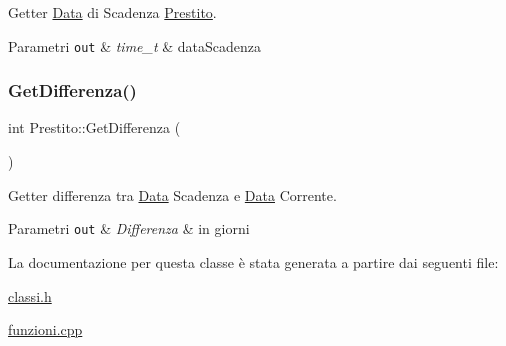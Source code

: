 Getter \mbox{\hyperlink{class_data}{Data}} di Scadenza \mbox{\hyperlink{class_prestito}{Prestito}}. 


\begin{DoxyParams}[1]{Parametri}
\mbox{\tt out}  & {\em time\+\_\+t} & data\+Scadenza \\
\hline
\end{DoxyParams}
\mbox{\label{class_prestito_a556664904743c53cc6504a913b0c7394}} 
\subsubsection{\texorpdfstring{Get\+Differenza()}{GetDifferenza()}}
{\footnotesize\ttfamily int Prestito\+::\+Get\+Differenza (\begin{DoxyParamCaption}{ }\end{DoxyParamCaption})}



Getter differenza tra \mbox{\hyperlink{class_data}{Data}} Scadenza e \mbox{\hyperlink{class_data}{Data}} Corrente. 


\begin{DoxyParams}[1]{Parametri}
\mbox{\tt out}  & {\em Differenza} & in giorni \\
\hline
\end{DoxyParams}


La documentazione per questa classe è stata generata a partire dai seguenti file\+:\begin{DoxyCompactItemize}
\item 
\mbox{\hyperlink{classi_8h}{classi.\+h}}\item 
\mbox{\hyperlink{funzioni_8cpp}{funzioni.\+cpp}}\end{DoxyCompactItemize}
